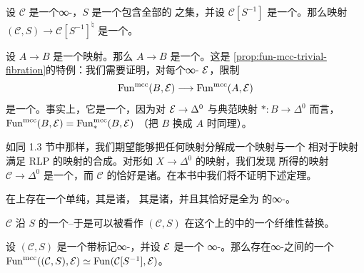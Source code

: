 \begin{example*}
设 $\mathcal{C}$ 是一个∞-\trCategory{}，$S$ 是一个包含全部\trEquivalence{}的%
\trMorphism{}之集，并设 $\mathcal{C}[S^{-1}]$ 是一个\trLocalization{}。那么映射
$(\mathcal{C}, S) \to \mathcal{C}[S^{-1}]^\natural$ 是一个\trMarkedEquivalence。
\end{example*}

\begin{example*}
设 $A \to B$ 是一个\trMarkedLeftAnodyne{}映射。那么 $A \to B$ 是一个\trMarkedEquivalence{}。这是%
\cref{prop:fun-mcc-trivial-fibration}的特例：我们需要证明，对每个∞-\trCategory{}%
$\mathcal{E}$，限制\trFunctor{}%
\[
\mathrm{Fun}^{\mathrm{mcc}}(B, \mathcal{E})
\longrightarrow
\mathrm{Fun}^{\mathrm{mcc}}(A, \mathcal{E})
\]
是一个\trJoyalEquivalence{}。事实上，它是一个\trTrivialFibration{}，因为对%
\trCocartesianFibration{} $\mathcal{E} \to \Delta^0$ 与典范映射 $*\colon B \to \Delta^0$
而言，$\mathrm{Fun}^{\mathrm{mcc}}(B, \mathcal{E}) = \mathrm{Fun}^{\mathrm{mcc}}_*(B, \mathcal{E})$
（把 $B$ 换成 $A$ 时同理）。
\end{example*}

如同 1.3 节中那样，我们期望能够把任何映射分解成一个\trMarkedAnodyne{}映射与一个%
相对于\trMarkedAnodyne{}映射满足 RLP 的映射的合成。对形如 $X \to \Delta^0$ 的映射，我们发现
所得的映射 $\mathcal{C} \to \Delta^0$ 是一个\trInnerFibration{}，而 $\mathcal{C}$
的\trMarkedEdge{}恰好是诸\trEquivalence{}。在本书中我们将不证明下述定理。

\begin{theorem}\label{thm:marked-model-structure}
在\trMarkedSimplicialSet{}上存在一个单纯\trModelStructure{}，其\trCofibration{}是诸\trMonomorphism{}，
其\trEquivalence{}是诸\trMarkedEquivalence{}，并且其\trFibrantObject{}恰好是\trMarkedEdge{}全为%
\trEquivalence{}的∞-\trCategories{}。
\end{theorem}

\begin{corollary}\label{cor:dk-fibrant-replacement}
$\mathcal{C}$ 沿 $S$ 的一个\trDwyer{}--\trKan{}\trLocalization{}于是可以被看作
$(\mathcal{C}, S)$ 在这个\trMarkedSimplicialSet{}上的\trModelStructure{}中的一个纤维性替换。
\end{corollary}

\begin{lemma}\label{lem:marked-equiv-localization}
设 $(\mathcal{C}, S)$ 是一个带标记∞-\trCategory{}，并设 $\mathcal{E}$ 是一个
∞-\trCategory{}。那么存在∞-\trCategories{}之间的一个\trEquivalence{} $\mathrm{Fun}^{\mathrm{mcc}}((\mathcal{C}, S), \mathcal{E}) \simeq \mathrm{Fun}(\mathcal{C}[S^{-1}], \mathcal{E})$。
\end{lemma}

